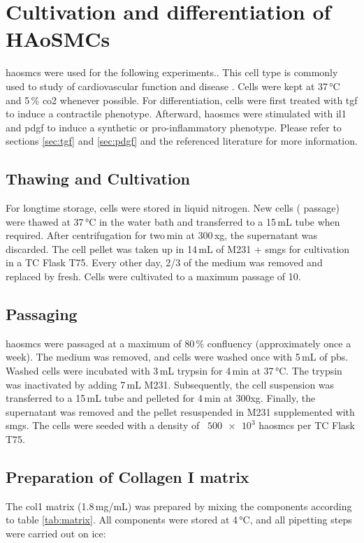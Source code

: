 \section{Cultivation and differentiation of HAoSMCs}
\label{sec:cultivation}
\Acp{haosmc} were used for the following experiments.. This cell type is commonly used to study of cardiovascular function and disease \cite{[Reference for this claim]}. Cells were kept at 37\,°C and 5\,\% \ac{co2} whenever possible. For differentiation, cells were first treated with \ac{tgf} to induce a contractile phenotype. Afterward, \acp{haosmc} were stimulated with \acf{il1} and \ac{pdgf} to induce a synthetic or pro-inflammatory phenotype. Please refer to sections \ref{sec:tgf} and \ref{sec:pdgf} and the referenced literature for more information.

    \subsection{Thawing and Cultivation}
    For longtime storage, cells were stored in liquid nitrogen. New cells ( passage) were thawed at 37\,°C in the water bath and transferred to a 15\,mL tube when required. After centrifugation for two\,min at 300\,xg, the supernatant was discarded. The cell pellet was taken up in 14\,mL of \ac{M231} + \ac{smgs} for cultivation in a TC Flask T75. Every other day, 2/3 of the medium was removed and replaced by fresh. Cells were cultivated to a maximum passage of 10.

    \subsection{Passaging}
    \acp{haosmc} were passaged at a maximum of 80\,\% confluency (approximately once a week). The medium was removed, and cells were washed once with 5\,mL of \ac{pbs}. Washed cells were incubated with 3\,mL trypsin for 4\,min at 37\,°C. The trypsin was inactivated by adding 7\,mL \ac{M231}. Subsequently, the cell suspension was transferred to a 15\,mL tube and pelleted for 4\,min at 300xg. Finally, the supernatant was removed and the pellet resuspended in \ac{M231} supplemented with \ac{smgs}. The cells were seeded with a density of ~$\num{500e3}$ \acp{haosmc} per TC Flask T75.

    \subsection{Preparation of Collagen I matrix}
    \label{subsec:matrix}
    The \ac{col1} matrix (1.8\,mg/mL) was prepared by mixing the components according to table \ref{tab:matrix}. All components were stored at 4\,°C, and all pipetting steps were carried out on ice:

